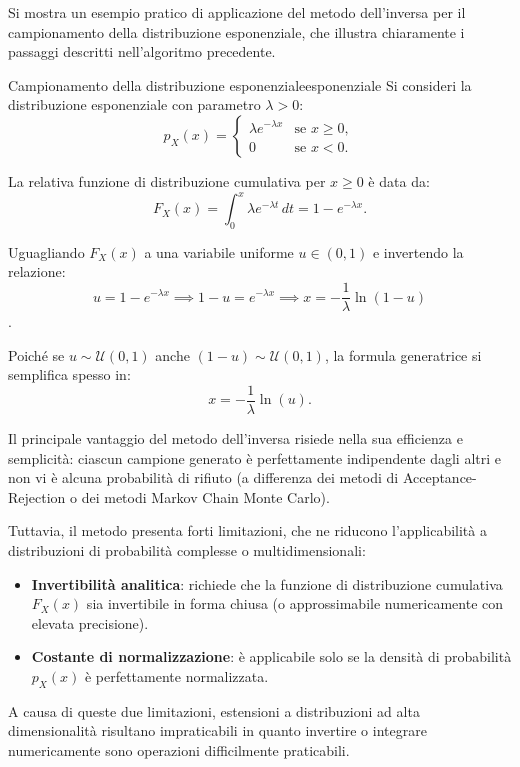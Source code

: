 Si mostra un esempio pratico di applicazione del metodo dell'inversa per il campionamento della distribuzione esponenziale, che illustra chiaramente i passaggi descritti nell'algoritmo precedente.

\begin{example}{Campionamento della distribuzione esponenziale}{esponenziale}
Si consideri la distribuzione esponenziale con parametro $\lambda > 0$:
\[
p_X(x) = \begin{cases} 
\lambda e^{-\lambda x} & \text{se } x \geq 0, \\
0 & \text{se } x < 0.
\end{cases}
\]

La relativa funzione di distribuzione cumulativa per $x \geq 0$ è data da:
\[
F_X(x) = \int_{0}^{x} \lambda e^{-\lambda t} \, dt = 1 - e^{-\lambda x}.
\]

Uguagliando $F_X(x)$ a una variabile uniforme $u \in (0,1)$ e invertendo la relazione:
\[u = 1 - e^{-\lambda x} \implies 1 - u = e^{-\lambda x} \implies x = -\frac{1}{\lambda} \ln(1 - u)\].

Poiché se $u \sim \mathcal{U}(0,1)$ anche $(1 - u) \sim \mathcal{U}(0,1)$, la formula generatrice si semplifica spesso in:
\[x = -\frac{1}{\lambda} \ln(u).\]
\end{example}

Il principale vantaggio del metodo dell'inversa risiede nella sua efficienza e semplicità: ciascun campione generato è perfettamente indipendente dagli altri e non vi è alcuna probabilità di rifiuto (a differenza dei metodi di Acceptance-Rejection o dei metodi Markov Chain Monte Carlo).

Tuttavia, il metodo presenta forti limitazioni, che ne riducono l'applicabilità a distribuzioni di probabilità complesse o multidimensionali:
\begin{itemize}
    \item \textbf{Invertibilità analitica}: richiede che la funzione di distribuzione cumulativa $F_X(x)$ sia invertibile in forma chiusa (o approssimabile numericamente con elevata precisione). 
    \item \textbf{Costante di normalizzazione}: è applicabile solo se la densità di probabilità $p_X(x)$ è perfettamente normalizzata.
\end{itemize}
A causa di queste due limitazioni, estensioni a distribuzioni ad alta dimensionalità risultano impraticabili in quanto invertire o integrare numericamente sono operazioni difficilmente praticabili.

